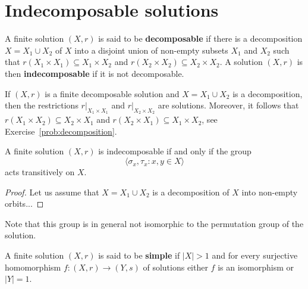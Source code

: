 \chapter{Indecomposable solutions}

\begin{definition}
A finite solution $(X,r)$ is said to be \textbf{decomposable} if there is a 
decomposition $X=X_1\cup X_2$ of $X$ into a disjoint union of
non-empty subsets $X_1$ and $X_2$ such that 
$r(X_1\times X_1)\subseteq X_1\times X_2$ and $r(X_2\times X_2)\subseteq X_2\times X_2$. 
A solution $(X,r)$ is then \textbf{indecomposable} if it is not decomposable. 
\end{definition}

If $(X,r)$ is a finite decomposable solution and $X=X_1\cup X_2$ is a decomposition, then
the restrictions $r|_{X_1\times X_1}$ and $r|_{X_2\times X_2}$ are solutions. Moreover, 
it follows that $r(X_1\times X_2)\subseteq X_2\times X_1$ and 
$r(X_2\times X_1)\subseteq X_1\times X_2$, 
see Exercise~\ref{prob:decomposition}.

\begin{proposition}
A finite solution $(X,r)$ is indecomposable if and only if 
the group 
\[
\langle \sigma_x,\tau_x:x,y\in X\rangle
\]
acts transitively on $X$. 
\end{proposition}

\begin{proof}
    Let us assume that $X=X_1\cup X_2$ is a decomposition of $X$ into non-empty orbits... 
\end{proof}

Note that this group is in general not isomorphic to the permutation group of the solution. 

\begin{definition}
A finite solution $(X,r)$ is said to be \textbf{simple} if $|X|>1$ and for every 
surjective homomorphism $f\colon (X,r)\to (Y,s)$ of solutions
either $f$ is an isomorphism or $|Y|=1$. 
\end{definition}

\begin{example}
\end{example}

\begin{example}
\end{example}

\begin{example}
\end{example}

